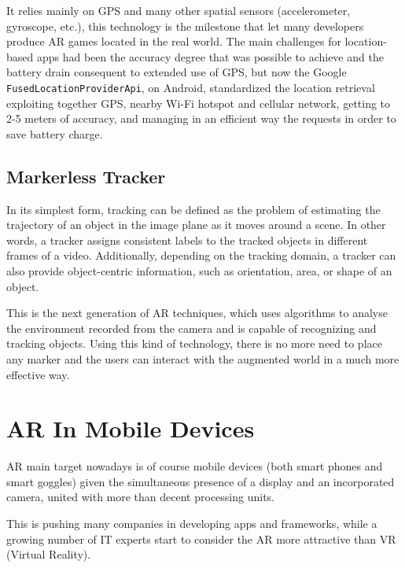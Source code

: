 			It relies mainly on GPS and many other spatial sensors (accelerometer, gyroscope, etc.), this technology is the milestone that let many developers produce AR games located in the real world.
			The main challenges for location-based apps had been the accuracy degree that was possible to achieve and the battery drain consequent to extended use of GPS, but now the Google \lstinline|FusedLocationProviderApi|, on Android, standardized the location retrieval exploiting together GPS, nearby Wi-Fi hotspot and cellular network, getting to 2-5 meters of accuracy, and managing in an efficient way the requests in order to save battery charge. %

		\subsection{Markerless Tracker}
			
			\begin{quoting}
				In its simplest form, tracking can be defined as the problem of estimating the trajectory of an object in the image plane as it moves around a scene. In other words, a tracker assigns consistent labels to the tracked objects in different frames of a video. Additionally, depending on the tracking domain, a tracker can also provide object-centric information, such as orientation, area, or shape of an object.~\cite{ylmaz:tracking}
			\end{quoting}
			
			This is the next generation of AR techniques, which uses algorithms to analyse the environment recorded from the camera and is capable of recognizing and tracking objects. Using this kind of technology, there is no more need to place any marker and the users can interact with the augmented world in a much more effective way.
			
	
	\section{AR In Mobile Devices}
	
		AR main target nowadays is of course mobile devices (both smart phones and smart goggles) given the simultaneous presence of a display and an incorporated camera, united with more than decent processing units.
		
		This is pushing many companies in developing apps and frameworks, while a growing number of IT experts start to consider the AR more attractive than VR (Virtual Reality).
		
